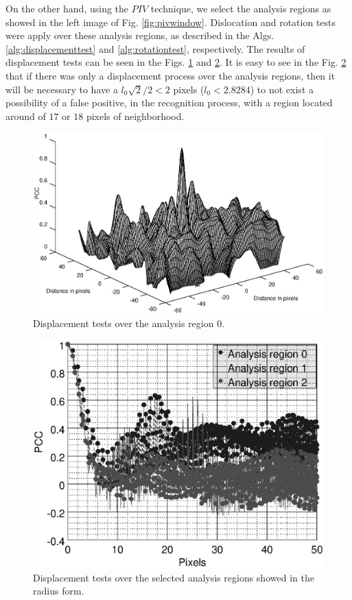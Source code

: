 On the other hand, using the $PIV$ technique, we select the analysis regions as showed in the
left image of Fig. \ref{fig:pivwindow}.   Dislocation
and rotation tests were apply over these analysis regions, 
as described in the Algs. \ref{alg:displacementtest} and \ref{alg:rotationtest},
respectively. The results of displacement tests can be seen in the 
Figs. \ref{fig:numresult1-des} and  \ref{fig:numresult1-des-max}.
It is easy to see in the Fig. \ref{fig:numresult1-des-max} 
that if there was only a displacement process over the analysis regions,
then it will be necessary to have a $l_0\sqrt{2}/2<2$ pixels ($l_0<2.8284$) 
to not exist a possibility of a false positive, in 
the recognition process, with a region located around of $17$ or $18$ pixels of neighborhood.
\begin{figure}[H]
\centering
\includegraphics[width=\columnwidth]{PCC-Point0-multi_des.eps}
\caption{Displacement tests over the analysis region 0.}
\label{fig:numresult1-des}
\end{figure}
\begin{figure}[H]
\centering
\includegraphics[width=\columnwidth]{numresult1-maketestjoint-multi_des_max.eps}
\caption{Displacement tests over the selected analysis regions showed in the radius form.}
\label{fig:numresult1-des-max}
\end{figure}

